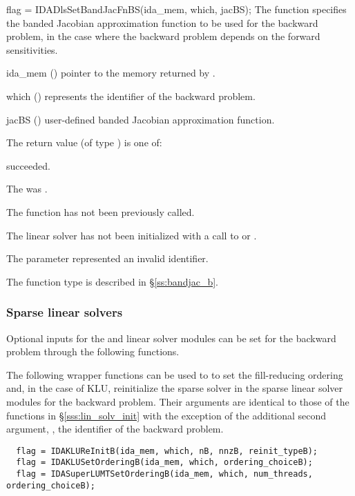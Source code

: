 {
  flag = IDADlsSetBandJacFnBS(ida\_mem, which, jacBS);
}
{
  The function  specifies the banded Jacobian
  approximation function to be used for the backward problem, in the case
  where the backward problem depends on the forward sensitivities.
}
{
  \begin{args}
  \item[ida\_mem] ()
    pointer to the {\idas} memory returned by .
  \item[which] ()
    represents the identifier of the backward problem.
  \item[jacBS] ()
    user-defined banded Jacobian approximation function.
  \end{args}
}
{
  The return value  (of type ) is one of:
  \begin{args}
  \item[\Id{IDADLS\_SUCCESS}] 
     succeeded.
  \item[\Id{IDADLS\_MEM\_NULL}]
    The  was .
  \item[\Id{IDADLS\_NO\_ADJ}]
    The function  has not been previously called.
  \item[\Id{IDADLS\_LMEM\_NULL}]
    The linear solver has not been initialized with a call to  or
    .
  \item[\Id{IDADLS\_ILL\_INPUT}]
    The parameter  represented an invalid identifier.
  \end{args}
}
{
  The function type  is described in \S\ref{ss:bandjac_b}.
}


\subsubsection{Sparse linear solvers}
Optional inputs for the {\idaklu} and {\idasuperlumt} linear solver
modules can be set for the backward problem through the following 
functions. 

The following wrapper functions can be used to to set the fill-reducing 
ordering and, in the case of KLU, reinitialize the sparse solver in the 
sparse linear solver modules for the backward problem.
Their arguments are identical to those
of the functions in \S\ref{sss:lin_solv_init} with the exception of the additional
second argument, , the identifier of the backward problem.
\begin{verbatim}
  flag = IDAKLUReInitB(ida_mem, which, nB, nnzB, reinit_typeB);
  flag = IDAKLUSetOrderingB(ida_mem, which, ordering_choiceB);
  flag = IDASuperLUMTSetOrderingB(ida_mem, which, num_threads, ordering_choiceB);
\end{verbatim}

